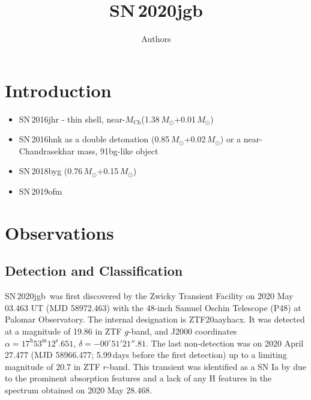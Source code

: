 \documentclass[twocolumn]{aastex631}
\newcommand{\sn}{SN\,2020jgb}
\newcommand{\Mch}{$M_\mathrm{Ch}$}
\begin{document}
\title{\sn}

\author{Authors}

\begin{abstract}

\end{abstract}


\section{Introduction} \label{sec:intro}
\begin{itemize}
    \item SN\,2016jhr \citep{jiang_16jhr_2017} - thin shell, near-\Mch (1.38\,$M_\odot$+0.01\,$M_\odot$)
    \item SN\,2016hnk as a double detonation \citep{jacobson-galan_16hnk_2020} (0.85\,$M_\odot$+0.02\,$M_\odot$) or a near-Chandrasekhar mass, 91bg-like object \citep{galbany_16hnk_2019}
    \item SN\,2018byg (0.76\,$M_\odot$+0.15\,$M_\odot$) \citep{de_18byg_2019}
    \item SN\,2019ofm \citep{de_Ca_rich_2020}
\end{itemize}
\section{Observations} \label{sec:obs}
\subsection{Detection and Classification}
\sn\ was first discovered by the Zwicky Transient Facility \citep[ZTF;][]{ZTF2019a,ZTF2019b} on 2020 May 03.463 UT (MJD 58972.463) with the 48-inch Samuel Oschin Telescope (P48) at Palomar Observatory. The internal designation is ZTF20aayhacx. It was detected at a magnitude of 19.86 in ZTF $g$-band, and J2000 coordinates $\alpha=17^\mathrm{h}53^\mathrm{m}12^\mathrm{s}.651$, $\delta=-00^\circ51'21''.81$. The last non-detection was on 2020 April 27.477 (MJD 58966.477; 5.99\,days before the first detection) up to a limiting magnitude of 20.7 in ZTF $r$-band. This transient was identified as a SN Ia by \citet{TNS_2020} due to the prominent  absorption features and a lack of any H features in the spectrum obtained on 2020 May 28.468.
\end{document}
